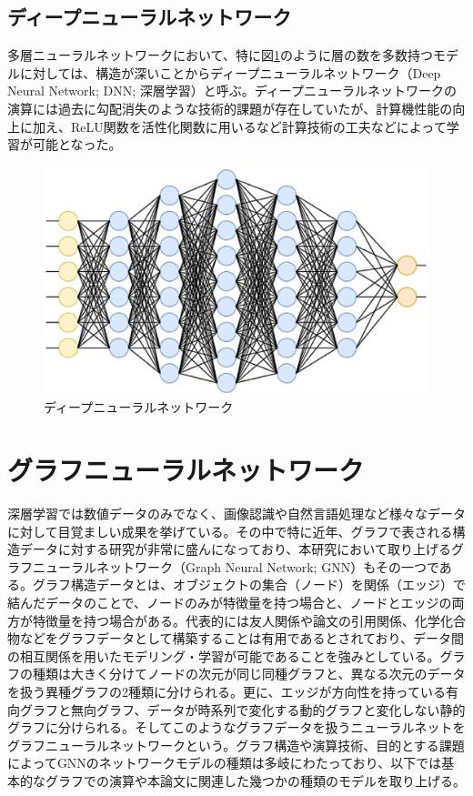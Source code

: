\subsection{ディープニューラルネットワーク}
多層ニューラルネットワークにおいて、特に図\ref{dnn}のように層の数を多数持つモデルに対しては、構造が深いことからディープニューラルネットワーク（Deep Neural Network; DNN; 深層学習）と呼ぶ。ディープニューラルネットワークの演算には過去に勾配消失のような技術的課題が存在していたが、計算機性能の向上に加え、ReLU関数を活性化関数に用いるなど計算技術の工夫などによって学習が可能となった。
\begin{figure}[H]
	\begin{center}
 \includegraphics[keepaspectratio, scale=0.4]
 	{Figure/Deeplearning/dnn.png}
 		\caption{ディープニューラルネットワーク}
 		\label{dnn}
	\end{center}
\end{figure}
\section{グラフニューラルネットワーク}
深層学習では数値データのみでなく、画像認識や自然言語処理など様々なデータに対して目覚ましい成果を挙げている。その中で特に近年、グラフで表される構造データに対する研究が非常に盛んになっており、本研究において取り上げるグラフニューラルネットワーク（Graph Neural Network; GNN）\cite{gnnreview}もその一つである。グラフ構造データとは、オブジェクトの集合（ノード）を関係（エッジ）で結んだデータのことで、ノードのみが特徴量を持つ場合と、ノードとエッジの両方が特徴量を持つ場合がある。代表的には友人関係や論文の引用関係、化学化合物などをグラフデータとして構築することは有用であるとされており、データ間の相互関係を用いたモデリング・学習が可能であることを強みとしている。グラフの種類は大きく分けてノードの次元が同じ同種グラフと、異なる次元のデータを扱う異種グラフの2種類に分けられる。更に、エッジが方向性を持っている有向グラフと無向グラフ、データが時系列で変化する動的グラフと変化しない静的グラフに分けられる。そしてこのようなグラフデータを扱うニューラルネットをグラフニューラルネットワークという。グラフ構造や演算技術、目的とする課題によってGNNのネットワークモデルの種類は多岐にわたっており、以下では基本的なグラフでの演算や本論文に関連した幾つかの種類のモデルを取り上げる。\\
